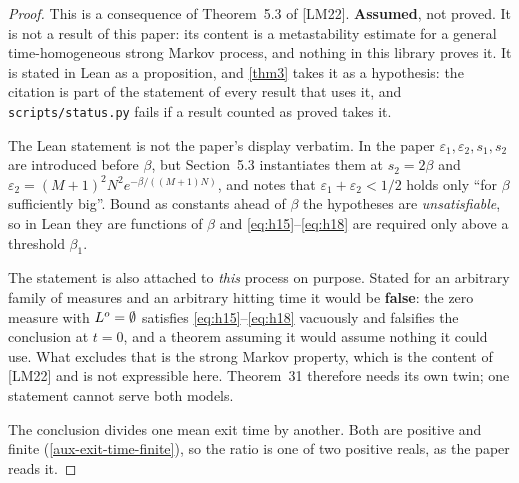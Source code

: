 \begin{proof}
  This is a consequence of Theorem~5.3 of [LM22].  \textbf{Assumed}, not
  proved.  It is not a result of this paper: its content is a metastability
  estimate for a general time-homogeneous strong Markov process, and nothing
  in this library proves it.  It is stated in Lean as a proposition, and
  \ref{thm3} takes it as a hypothesis: the citation is part of the statement
  of every result that uses it, and \texttt{scripts/status.py} fails if a
  result counted as proved takes it.

  The Lean statement is not the paper's display verbatim.  In the paper
  $\varepsilon_1, \varepsilon_2, s_1, s_2$ are introduced before $\beta$, but
  Section~5.3 instantiates them at $s_2 = 2\beta$ and
  $\varepsilon_2 = (M+1)^2N^2 e^{-\beta/((M+1)N)}$, and notes that
  $\varepsilon_1 + \varepsilon_2 < 1/2$ holds only ``for $\beta$ sufficiently
  big''.  Bound as constants ahead of $\beta$ the hypotheses are
  \emph{unsatisfiable}, so in Lean they are functions of $\beta$ and
  \eqref{eq:h15}--\eqref{eq:h18} are required only above a threshold
  $\beta_1$.

  The statement is also attached to \emph{this} process on purpose.  Stated
  for an arbitrary family of measures and an arbitrary hitting time it would
  be \textbf{false}: the zero measure with $L^o = \emptyset$ satisfies
  \eqref{eq:h15}--\eqref{eq:h18} vacuously and falsifies the conclusion at
  $t = 0$, and a theorem assuming it would assume nothing it could use.  What
  excludes that is the strong Markov property, which is the content of [LM22]
  and is not expressible here.  Theorem~31 therefore needs its own twin; one
  statement cannot serve both models.

  The conclusion divides one mean exit time by another.  Both are positive and
  finite (\ref{aux-exit-time-finite}), so the ratio is one of two positive
  reals, as the paper reads it.
\end{proof}

